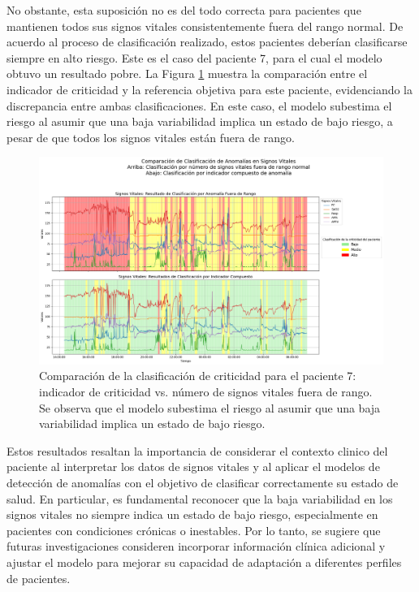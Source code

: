No obstante, esta suposición no es del todo correcta para pacientes que mantienen todos sus signos vitales consistentemente fuera del rango normal. De acuerdo al proceso de clasificación realizado, estos pacientes deberían clasificarse siempre en alto riesgo. Este es el caso del paciente 7, para el cual el modelo obtuvo un resultado pobre. La Figura \ref{fig:comparacion_clasificacion_paciente7} muestra la comparación entre el indicador de criticidad y la referencia objetiva para este paciente, evidenciando la discrepancia entre ambas clasificaciones. En este caso, el modelo subestima el riesgo al asumir que una baja variabilidad implica un estado de bajo riesgo, a pesar de que todos los signos vitales están fuera de rango.

\begin{figure}[ht]
  \centering
  \includegraphics[width=\textwidth]{Images/comparacion_indicador_con_fuera_de_rango_paciente_7.png}
  \caption{Comparación de la clasificación de criticidad para el paciente 7: indicador de criticidad vs. número de signos vitales fuera de rango. Se observa que el modelo subestima el riesgo al asumir que una baja variabilidad implica un estado de bajo riesgo.}
  \label{fig:comparacion_clasificacion_paciente7}
\end{figure}

Estos resultados resaltan la importancia de considerar el contexto clinico del paciente al interpretar los datos de signos vitales y al aplicar el modelos de detección de anomalías con el objetivo de clasificar correctamente su estado de salud. En particular, es fundamental reconocer que la baja variabilidad en los signos vitales no siempre indica un estado de bajo riesgo, especialmente en pacientes con condiciones crónicas o inestables. Por lo tanto, se sugiere que futuras investigaciones consideren incorporar información clínica adicional y ajustar el modelo para mejorar su capacidad de adaptación a diferentes perfiles de pacientes.

